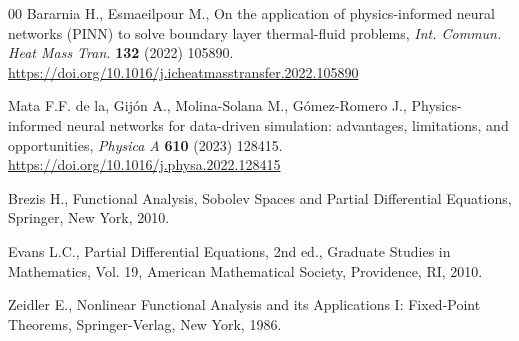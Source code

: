 \documentclass[reqno]{amsart}
\begin{document}
\begin{thebibliography}{00}
Bararnia H., Esmaeilpour M., On the application of physics-informed neural networks (PINN) to solve boundary layer thermal-fluid problems, \textit{Int. Commun. Heat Mass Tran.} \textbf{132} (2022) 105890. \url{https://doi.org/10.1016/j.icheatmasstransfer.2022.105890}

Mata F.F. de la, Gijón A., Molina-Solana M., Gómez-Romero J., Physics-informed neural networks for data-driven simulation: advantages, limitations, and opportunities, \textit{Physica A} \textbf{610} (2023) 128415. \url{https://doi.org/10.1016/j.physa.2022.128415}

Brezis H., Functional Analysis, Sobolev Spaces and Partial Differential Equations, Springer, New York, 2010.

Evans L.C., Partial Differential Equations, 2nd ed., Graduate Studies in Mathematics, Vol. 19, American Mathematical Society, Providence, RI, 2010.

Zeidler E., Nonlinear Functional Analysis and its Applications I: Fixed-Point Theorems, Springer-Verlag, New York, 1986.

\end{thebibliography}
\end{document}
